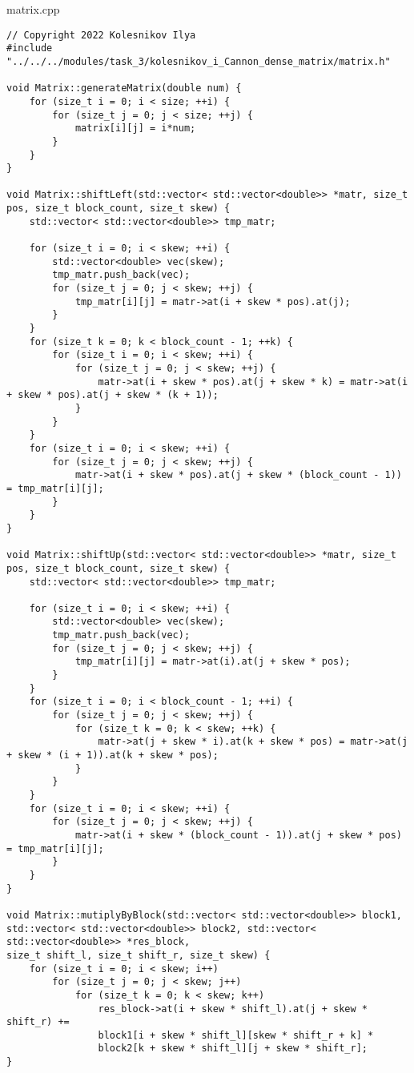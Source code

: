 \documentclass{report}
\begin{document}
matrix.cpp
\begin{lstlisting}
// Copyright 2022 Kolesnikov Ilya
#include "../../../modules/task_3/kolesnikov_i_Cannon_dense_matrix/matrix.h"

void Matrix::generateMatrix(double num) {
    for (size_t i = 0; i < size; ++i) {
        for (size_t j = 0; j < size; ++j) {
            matrix[i][j] = i*num;
        }
    }
}

void Matrix::shiftLeft(std::vector< std::vector<double>> *matr, size_t pos, size_t block_count, size_t skew) {
    std::vector< std::vector<double>> tmp_matr;

    for (size_t i = 0; i < skew; ++i) {
        std::vector<double> vec(skew);
        tmp_matr.push_back(vec);
        for (size_t j = 0; j < skew; ++j) {
            tmp_matr[i][j] = matr->at(i + skew * pos).at(j);
        }
    }
    for (size_t k = 0; k < block_count - 1; ++k) {
        for (size_t i = 0; i < skew; ++i) {
            for (size_t j = 0; j < skew; ++j) {
                matr->at(i + skew * pos).at(j + skew * k) = matr->at(i + skew * pos).at(j + skew * (k + 1));
            }
        }
    }
    for (size_t i = 0; i < skew; ++i) {
        for (size_t j = 0; j < skew; ++j) {
            matr->at(i + skew * pos).at(j + skew * (block_count - 1)) = tmp_matr[i][j];
        }
    }
}

void Matrix::shiftUp(std::vector< std::vector<double>> *matr, size_t pos, size_t block_count, size_t skew) {
    std::vector< std::vector<double>> tmp_matr;

    for (size_t i = 0; i < skew; ++i) {
        std::vector<double> vec(skew);
        tmp_matr.push_back(vec);
        for (size_t j = 0; j < skew; ++j) {
            tmp_matr[i][j] = matr->at(i).at(j + skew * pos);
        }
    }
    for (size_t i = 0; i < block_count - 1; ++i) {
        for (size_t j = 0; j < skew; ++j) {
            for (size_t k = 0; k < skew; ++k) {
                matr->at(j + skew * i).at(k + skew * pos) = matr->at(j + skew * (i + 1)).at(k + skew * pos);
            }
        }
    }
    for (size_t i = 0; i < skew; ++i) {
        for (size_t j = 0; j < skew; ++j) {
            matr->at(i + skew * (block_count - 1)).at(j + skew * pos) = tmp_matr[i][j];
        }
    }
}

void Matrix::mutiplyByBlock(std::vector< std::vector<double>> block1,
std::vector< std::vector<double>> block2, std::vector< std::vector<double>> *res_block,
size_t shift_l, size_t shift_r, size_t skew) {
    for (size_t i = 0; i < skew; i++)
        for (size_t j = 0; j < skew; j++)
            for (size_t k = 0; k < skew; k++)
                res_block->at(i + skew * shift_l).at(j + skew * shift_r) +=
                block1[i + skew * shift_l][skew * shift_r + k] *
                block2[k + skew * shift_l][j + skew * shift_r];
}


\end{lstlisting}
\end{document}
